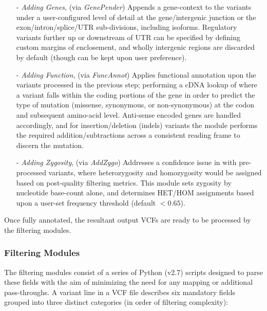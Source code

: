 \documentclass{bioinfo}
\begin{document}
\begin{methods}
\begin{itemize}

\item[-]{\it Adding Genes}{, (via \textit{GenePender}) Appends a gene-context to the variants under a user-configured level of detail at the gene/intergenic junction or the exon/intron/splice/UTR sub-divisions, including isoforms. Regulatory variants further up or downstream of UTR can be specified by defining custom margins of enclosement, and wholly intergenic regions are discarded by default (though can be kept upon user preference). 
}
\item[-]{\it Adding Function}{, (via \textit{FuncAnnot}) Applies functional annotation upon the variants processed in the previous step; performing a cDNA lookup of where a variant falls within the coding portions of the gene in order to predict the type of mutation (missense, synonymous, or non-synonymous) at the codon and subsequent amino-acid level. Anti-sense encoded genes are handled accordingly, and for insertion/deletion (indels) variants the module performs the required addition/subtractions across a consistent reading frame to discern the mutation.
}
\item[-]{\it Adding Zygosity}{, (via \textit{AddZygo}) Addresses a confidence issue in with pre-processed variants, where heterozygosity and homozygosity would be assigned based on post-quality filtering metrics. This module sets zygosity by nucleotide base-count alone, and determines HET/HOM assignments based upon a user-set frequency threshold (default $<0.65$).
}
\end{itemize}

Once fully annotated, the resultant output VCFs are ready to be processed by the filtering modules.



\subsubsection{Filtering Modules}

The filtering modules consist of a series of Python (v2.7) scripts designed to parse these fields with the aim of minimizing the need for any mapping or additional pass-throughs. A variant line in a VCF file describes six mandatory fields grouped into three distinct categories (in order of filtering complexity):


\end{methods}
\end{document}
